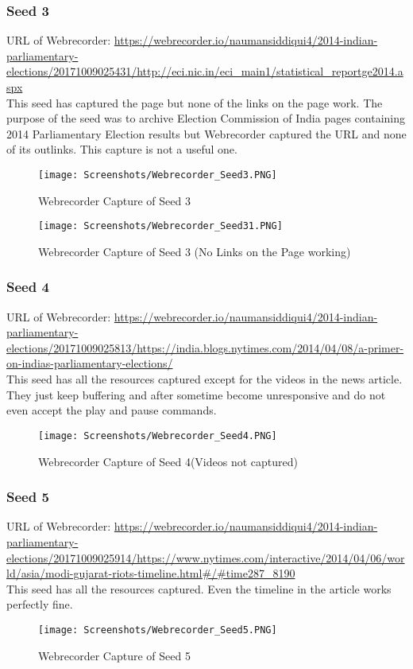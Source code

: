 \documentclass[11pt,journal,compsoc,onecolumn]{IEEEtran}
\begin{document}
\subsubsection{Seed 3}
URL of Webrecorder: 
\url{https://webrecorder.io/naumansiddiqui4/2014-indian-parliamentary-elections/20171009025431/http://eci.nic.in/eci_main1/statistical_reportge2014.aspx}\\
This seed has captured the page but none of the links on the page work. The purpose of the seed was to archive Election Commission of India pages containing 2014 Parliamentary Election results but Webrecorder captured the URL and none of its outlinks. This capture is not a useful one.
 \begin{figure}[ht] 
  \centering
  \texttt{[image: Screenshots/Webrecorder\_Seed3.PNG]}
  \caption{Webrecorder Capture of Seed 3}
  \label{fig:5}
\end{figure}
 \begin{figure}[ht] 
  \centering
  \texttt{[image: Screenshots/Webrecorder\_Seed31.PNG]}
  \caption{Webrecorder Capture of Seed 3 (No Links on the Page working)}
  \label{fig:6}
\end{figure}
\subsubsection{Seed 4}
URL of Webrecorder: 
\url{https://webrecorder.io/naumansiddiqui4/2014-indian-parliamentary-elections/20171009025813/https://india.blogs.nytimes.com/2014/04/08/a-primer-on-indias-parliamentary-elections/}\\
This seed has all the resources captured except for the videos in the news article. They just keep buffering and after sometime become unresponsive and do not even accept the play and pause commands.
 \begin{figure}[ht] 
  \centering
  \texttt{[image: Screenshots/Webrecorder\_Seed4.PNG]}
  \caption{Webrecorder Capture of Seed 4(Videos not captured)}
  \label{fig:7}
\end{figure}
\subsubsection{Seed 5}
URL of Webrecorder: 
\url{https://webrecorder.io/naumansiddiqui4/2014-indian-parliamentary-elections/20171009025914/https://www.nytimes.com/interactive/2014/04/06/world/asia/modi-gujarat-riots-timeline.html#/#time287_8190}\\
This seed has all the resources captured. Even the timeline in the article works perfectly fine.
 \begin{figure}[ht] 
  \centering
  \texttt{[image: Screenshots/Webrecorder\_Seed5.PNG]}
  \caption{Webrecorder Capture of Seed 5}
  \label{fig:8}
\end{figure}
\end{document}

